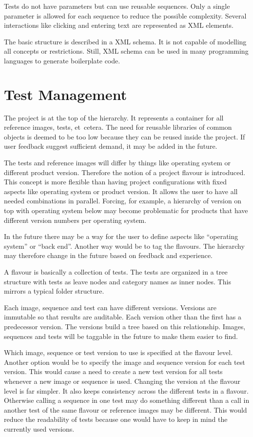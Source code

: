 \documentclass[a4paper,twocolumn,twoside]{article}
\begin{document}
Tests do not have parameters but can use reusable sequences.
Only a single parameter is allowed for each sequence to reduce the possible complexity.
Several interactions like clicking and entering text are represented as XML elements.

The basic structure is described in a XML schema.
It is not capable of modelling all concepts or restrictions.
Still, XML schema can be used in many programming languages to generate boilerplate code.

\section{Test Management}
The project is at the top of the hierarchy.
It represents a container for all reference images, tests, et~cetera.
The need for reusable libraries of common objects is deemed to be too low because they can be reused inside the project.
If user feedback suggest sufficient demand, it may be added in the future.

The tests and reference images will differ by things like operating system or different product version.
Therefore the notion of a project flavour is introduced.
This concept is more flexible than having project configurations with fixed aspects like operating system or product version.
It allows the user to have all needed combinations in parallel.
Forcing, for example, a hierarchy of version on top with operating system below may become problematic for products that have different version numbers per operating system.

In the future there may be a way for the user to define aspects like \enquote{operating system} or \enquote{back end}.
Another way would be to tag the flavours.
The hierarchy may therefore change in the future based on feedback and experience.

A flavour is basically a collection of tests.
The tests are organized in a tree structure with tests as leave nodes and category names as inner nodes.
This mirrors a typical folder structure.

Each image, sequence and test can have different versions.
Versions are immutable so that results are auditable.
Each version other than the first has a predecessor version.
The versions build a tree based on this relationship.
Images, sequences and tests will be taggable in the future to make them easier to find.

Which image, sequence or test version to use is specified at the flavour level.
Another option would be to specify the image and sequence version for each test version.
This would cause a need to create a new test version for all tests whenever a new image or sequence is used.
Changing the version at the flavour level is far simpler.
It also keeps consistency across the different tests in a flavour.
Otherwise calling a sequence in one test may do something different than a call in another test of the same flavour or reference images may be different.
This would reduce the readability of tests because one would have to keep in mind the currently used versions.
\end{document}
